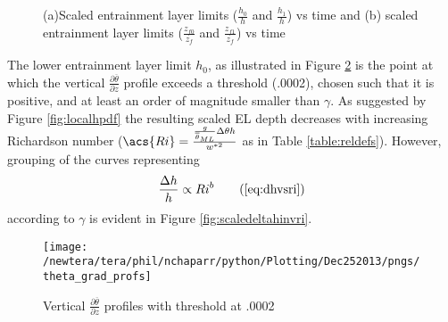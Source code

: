 \begin{figure}[htbp]
\begin{minipage}[b]{0.5\linewidth}
 
        \end{minipage}             
\quad
\begin{minipage}[b]{0.5\linewidth}
       \end{minipage}
        \caption[Scaled \acs{EL} limits]{(a)Scaled entrainment layer limits ($\frac{h_{0}}{h}$ and $\frac{h_{1}}{h}$) vs time and (b) scaled entrainment layer limits ($\frac{z_{f0}}{z_{f}}$ and $\frac{z_{f1}}{z_{f}}$) vs time}
        \label{fig:scaledELlims}
\end{figure}

The lower entrainment layer limit $h_{0}$, as illustrated in Figure \ref{fig:thresh} is the point at which the vertical 
$\frac{\partial \overline{\theta}}{\partial z}$ profile exceeds a threshold (.0002), chosen such that
it is positive, and at least an order of magnitude smaller than $\gamma$.   
As suggested by Figure \ref{fig:localhpdf} the resulting scaled \acs{EL} depth decreases with increasing Richardson number ($\acs{Ri} = \frac{\frac{g}{\overline{\theta}_{ML}}\Delta \theta h}{w^{*2}}$ as in Table \ref{table:reldefs}).  However, grouping of the curves representing
\begin{equation}
\frac{\Delta h}{h} \propto Ri ^{b} \tag{\ref{eq:dhvsri}}
\end{equation}
according to $\gamma$ is evident in Figure \ref{fig:scaledeltahinvri}.\\


\begin{figure}[htbp]
    \centering
    \texttt{[image: /newtera/tera/phil/nchaparr/python/Plotting/Dec252013/pngs/theta\_grad\_profs]}
    \caption{Vertical $\frac{\partial \overline{\theta}}{\partial z}$ profiles with threshold at .0002}
    \label{fig:thresh}   %
\end{figure}

